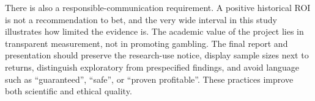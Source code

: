There is also a responsible-communication requirement. A positive historical ROI is not a recommendation to bet, and the very wide interval in this study illustrates how limited the evidence is. The academic value of the project lies in transparent measurement, not in promoting gambling. The final report and presentation should preserve the research-use notice, display sample sizes next to returns, distinguish exploratory from prespecified findings, and avoid language such as ``guaranteed'', ``safe'', or ``proven profitable''. These practices improve both scientific and ethical quality.
